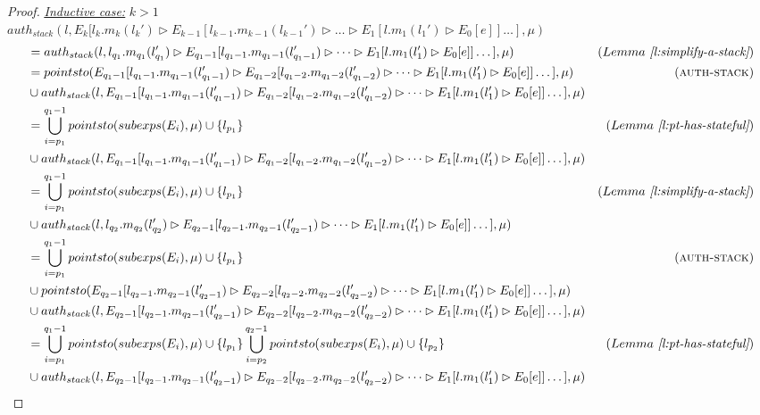 \documentclass{llncs}
\begin{document}
\begin{proof}
\noindent\underline{\underline{\textit{Inductive case:}}} $k > 1$\\
\noindent$auth_{stack}(l, E_k[l_k.m_k(l_k') \rhd E_{k-1}[l_{k-1}.m_{k-1}(l_{k-1}') \rhd \dots \rhd E_1[l.m_1(l_1') \rhd E_0[e]] \dots ], \mu)$
\vspace{-7pt}
\begin{align*}
&= auth_{stack}(l, l_{q_1}.m_{q_1}(l_{q_1}') \rhd E_{q_1-1}[l_{q_1-1}.m_{q_1-1}(l_{q_1-1}') \rhd \dots \rhd E_1[l.m_1(l_1') \rhd E_0[e]] \dots ], \mu) & (Lemma~\textit{\ref{l:simplify-a-stack}})\\
&= pointsto(E_{q_1-1}[l_{q_1-1}.m_{q_1-1}(l_{q_1-1}') \rhd E_{q_1-2}[l_{q_1-2}.m_{q_1-2}(l_{q_1-2}') \rhd \dots \rhd E_1[l.m_1(l_1') \rhd E_0[e]] \dots ], \mu) & (\textsc{auth-stack})\\
&\cup auth_{stack}(l, E_{q_1-1}[l_{q_1-1}.m_{q_1-1}(l_{q_1-1}') \rhd E_{q_1-2}[l_{q_1-2}.m_{q_1-2}(l_{q_1-2}') \rhd \dots \rhd E_1[l.m_1(l_1') \rhd E_0[e]] \dots ], \mu)\\
&= \bigcup^{q_1-1}_{i = p_1} pointsto(subexps(E_i), \mu) \cup \{ l_{p_1} \} & (Lemma~\textit{\ref{l:pt-has-stateful}})\\
&\cup auth_{stack}(l, E_{q_1-1}[l_{q_1-1}.m_{q_1-1}(l_{q_1-1}') \rhd E_{q_1-2}[l_{q_1-2}.m_{q_1-2}(l_{q_1-2}') \rhd \dots \rhd E_1[l.m_1(l_1') \rhd E_0[e]] \dots ], \mu)\\
& =\bigcup^{q_1-1}_{i = p_1} pointsto(subexps(E_i), \mu) \cup \{ l_{p_1} \} & (Lemma~\textit{\ref{l:simplify-a-stack}})\\
&\cup auth_{stack}(l, l_{q_2}.m_{q_2}(l_{q_2}') \rhd E_{q_2-1}[l_{q_2-1}.m_{q_2-1}(l_{q_2-1}') \rhd \dots \rhd E_1[l.m_1(l_1') \rhd E_0[e]] \dots ], \mu)\\
&= \bigcup^{q_1-1}_{i = p_1} pointsto(subexps(E_i), \mu) \cup \{ l_{p_1} \} & (\textsc{auth-stack})\\
&\cup pointsto(E_{q_2-1}[l_{q_2-1}.m_{q_2-1}(l_{q_2-1}') \rhd E_{q_2-2}[l_{q_2-2}.m_{q_2-2}(l_{q_2-2}') \rhd \dots \rhd E_1[l.m_1(l_1') \rhd E_0[e]] \dots ], \mu)\\
&\cup auth_{stack}(l, E_{q_2-1}[l_{q_2-1}.m_{q_2-1}(l_{q_2-1}') \rhd E_{q_2-2}[l_{q_2-2}.m_{q_2-2}(l_{q_2-2}') \rhd \dots \rhd E_1[l.m_1(l_1') \rhd E_0[e]] \dots ], \mu)\\
&= \bigcup^{q_1-1}_{i = p_1} pointsto(subexps(E_i), \mu) \cup \{ l_{p_1} \} \bigcup^{q_2-1}_{i = p_2} pointsto(subexps(E_i), \mu) \cup \{ l_{p_2} \}& (Lemma~\textit{\ref{l:pt-has-stateful}})\\
&\cup auth_{stack}(l, E_{q_2-1}[l_{q_2-1}.m_{q_2-1}(l_{q_2-1}') \rhd E_{q_2-2}[l_{q_2-2}.m_{q_2-2}(l_{q_2-2}') \rhd \dots \rhd E_1[l.m_1(l_1') \rhd E_0[e]] \dots ], \mu)\\

\end{align*}
\end{proof}
\end{document}
